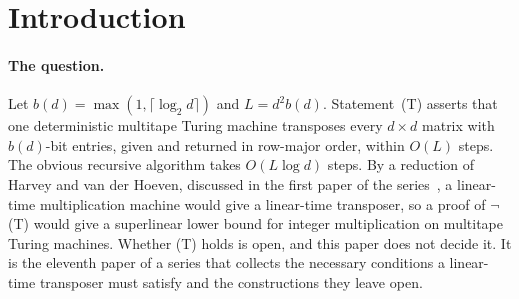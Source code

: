 \section{Introduction}\label{sec:intro}

\paragraph{The question.} Let $b(d)=\max(1,\lceil\log_2d\rceil)$ and $L=d^2b(d)$. Statement~(T) asserts that one
deterministic multitape Turing machine transposes every $d\times d$ matrix with $b(d)$-bit entries, given and returned in
row-major order, within $O(L)$ steps. The obvious recursive algorithm takes $O(L\log d)$ steps. By a reduction of Harvey
and van der Hoeven, discussed in the first paper of the series~\cite{FirstPaper2026}, a linear-time multiplication
machine would give a linear-time transposer, so a proof of $\neg$(T) would give a superlinear lower bound for integer
multiplication on multitape Turing machines. Whether (T) holds is open, and this paper does not decide it. It is the
eleventh paper of a series that collects the necessary conditions a linear-time transposer must satisfy and the
constructions they leave open.

